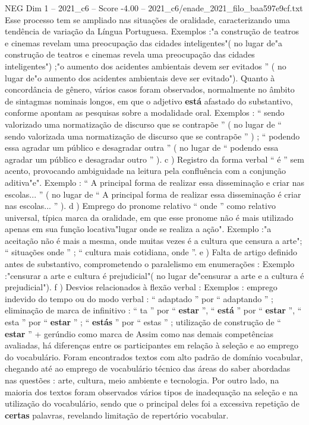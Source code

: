 \begin{textsample}{NEG Dim 1 – 2021\_c6 – Score -4.00 – 2021\_c6/enade\_2021\_filo\_baa597e9cf.txt}
Esse processo tem se ampliado nas situações de oralidade, caracterizando uma tendência de variação da Língua Portuguesa.
Exemplos :"a construção de teatros e cinemas revelam uma preocupação das cidades inteligentes"( no lugar de"a construção de teatros e cinemas revela uma preocupação das cidades inteligentes") ;"o aumento dos acidentes ambientais devem ser evitados ” ( no lugar de"o aumento dos acidentes ambientais deve ser evitado").
Quanto à concordância de gênero, vários casos foram observados, normalmente no âmbito de sintagmas nominais longos, em que o adjetivo \textbf{está} afastado do substantivo, conforme apontam as pesquisas sobre a modalidade oral.
Exemplos : “ sendo valorizado uma normatização de discurso que se contrapõe ” ( no lugar de “ sendo valorizada uma normatização de discurso que se contrapõe ” ) ; “ podendo essa agradar um público e desagradar outra ” ( no lugar de “ podendo essa agradar um público e desagradar outro ” ). c ) Registro da forma verbal “ é ” sem acento, provocando ambiguidade na leitura pela confluência com a conjunção aditiva"e".
Exemplo : “ A principal forma de realizar essa disseminação e criar nas escolas... ” ( no lugar de “ A principal forma de realizar essa disseminação é criar nas escolas... ” ). d ) Emprego do pronome relativo “ onde ” como relativo universal, típica marca da oralidade, em que esse pronome não é mais utilizado apenas em sua função locativa"lugar onde se realiza a ação".
Exemplo :"a aceitação não é mais a mesma, onde muitas vezes é a cultura que censura a arte"; “ situações onde ” ; “ cultura mais cotidiana, onde ”. e ) Falta de artigo definido antes de substantivo, comprometendo o paralelismo em enumerações : Exemplo :"censurar a arte e cultura é prejudicial"( no lugar de"censurar a arte e a cultura é prejudicial"). f ) Desvios relacionados à flexão verbal : Exemplos : emprego indevido do tempo ou do modo verbal : “ adaptado ” por “ adaptando ” ; eliminação de marca de infinitivo : “ ta ” por “ \textbf{estar} ”, “ \textbf{está} ” por “ \textbf{estar} ”, “ esta ” por “ \textbf{estar} ” ; “ \textbf{estás} ” por “ estas ” ; utilização de construção de “ \textbf{estar} ” + gerúndio como marca de Assim como nas demais competências avaliadas, há diferenças entre os participantes em relação à seleção e ao emprego do vocabulário.
Foram encontrados textos com alto padrão de domínio vocabular, chegando até ao emprego de vocabulário técnico das áreas do saber abordadas nas questões : arte, cultura, meio ambiente e tecnologia.
Por outro lado, na maioria dos textos foram observados vários tipos de inadequação na seleção e na utilização do vocabulário, sendo que o principal deles foi a excessiva repetição de \textbf{certas} palavras, revelando limitação de repertório vocabular.

\end{textsample}
